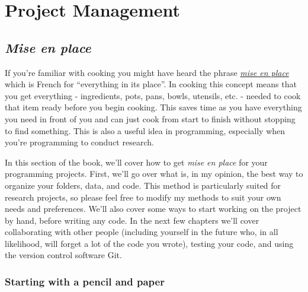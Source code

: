 \documentclass[
  12pt,
]{book}
\begin{document}
\hypertarget{part-project-management}{%
\part{Project Management}\label{part-project-management}}

\hypertarget{mise-en-place}{%
\chapter{\texorpdfstring{\emph{Mise en place}}{Mise en place}}\label{mise-en-place}}

If you're familiar with cooking you might have heard the phrase \href{https://en.wikipedia.org/wiki/Mise_en_place}{\emph{mise en place}} which is French for ``everything in its place''. In cooking this concept means that you get everything - ingredients, pots, pans, bowls, utensils, etc. - needed to cook that item ready before you begin cooking. This saves time as you have everything you need in front of you and can just cook from start to finish without stopping to find something. This is also a useful idea in programming, especially when you're programming to conduct research.

In this section of the book, we'll cover how to get \emph{mise en place} for your programming projects. First, we'll go over what is, in my opinion, the best way to organize your folders, data, and code. This method is particularly suited for research projects, so please feel free to modify my methods to suit your own needs and preferences. We'll also cover some ways to start working on the project by hand, before writing any code. In the next few chapters we'll cover collaborating with other people (including yourself in the future who, in all likelihood, will forget a lot of the code you wrote), testing your code, and using the version control software Git.

\hypertarget{starting-with-a-pencil-and-paper}{%
\section{Starting with a pencil and paper}\label{starting-with-a-pencil-and-paper}}
\end{document}
